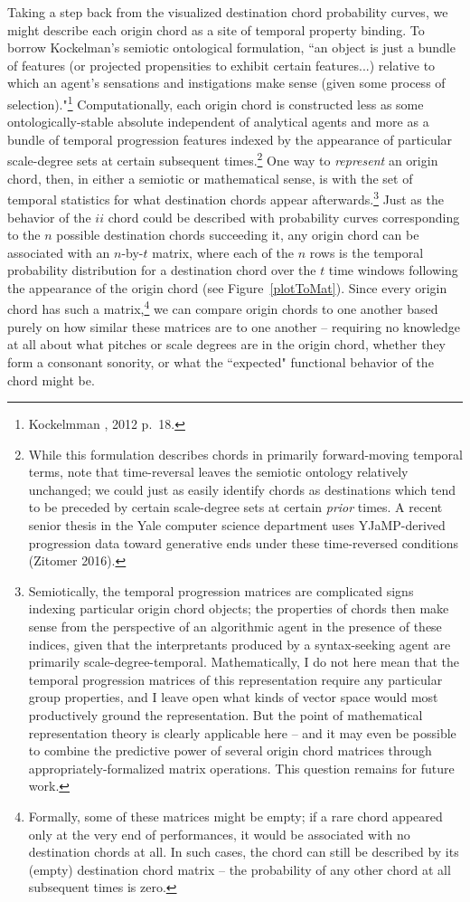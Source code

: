 Taking a step back from the visualized destination chord probability curves, we might describe each origin chord as a site of temporal property binding.  To borrow Kockelman's semiotic ontological formulation, ``an object is just a bundle of features (or projected propensities to exhibit certain features...) relative to which an agent's sensations and instigations make sense (given some process of selection)."\footnote{Kockelmman , 2012 p.\ 18.}  Computationally, each origin chord is constructed less as some ontologically-stable absolute independent of analytical agents and more as a bundle of temporal progression features indexed by the appearance of particular scale-degree sets at certain subsequent times.\footnote{While this formulation describes chords in primarily forward-moving temporal terms, note that time-reversal leaves the semiotic ontology relatively unchanged; we could just as easily identify chords as destinations which tend to be preceded by certain scale-degree sets at certain \emph{prior} times.  A recent senior thesis in the Yale computer science department uses YJaMP-derived progression data toward generative ends under these time-reversed conditions (Zitomer 2016).}  One way to \emph{represent} an origin chord, then, in either a semiotic or mathematical sense, is with the set of temporal statistics for what destination chords appear afterwards.\footnote{Semiotically, the temporal progression matrices are complicated signs indexing particular origin chord objects; the properties of chords then make sense from the perspective of an algorithmic agent in the presence of these indices, given that the interpretants produced by a syntax-seeking agent are primarily scale-degree-temporal.  Mathematically, I do not here mean that the temporal progression matrices of this representation require any particular group properties, and I leave open what kinds of vector space would most productively ground the representation.  But the point of mathematical representation theory is clearly applicable here -- and it may even be possible to combine the predictive power of several origin chord matrices through appropriately-formalized matrix operations.  This question remains for future work.}  Just as the behavior of the $ii$ chord could be described with probability curves corresponding to the $n$ possible destination chords succeeding it, any origin chord can be associated with an $n$-by-$t$ matrix, where each of the $n$ rows is the temporal probability distribution for a destination chord over the $t$ time windows following the appearance of the origin chord (see Figure~\ref{plotToMat}).  Since every origin chord has such a matrix,\footnote{Formally, some of these matrices might be empty; if a rare chord appeared only at the very end of performances, it would be associated with no destination chords at all.  In such cases, the chord can still be described by its (empty) destination chord matrix -- the probability of any other chord at all subsequent times is zero.} we can compare origin chords to one another based purely on how similar these matrices are to one another -- requiring no knowledge at all about what pitches or scale degrees are in the origin chord, whether they form a consonant sonority, or what the ``expected" functional behavior of the chord might be.

